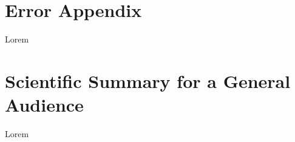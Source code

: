 \documentclass[10pt,twocolumn]{revtex4-2}    %
\begin{document}
\newpage

\section*{Error Appendix}
Lorem 


\clearpage

\onecolumngrid %

\section*{Scientific Summary for a General Audience}



Lorem 
\end{document}

